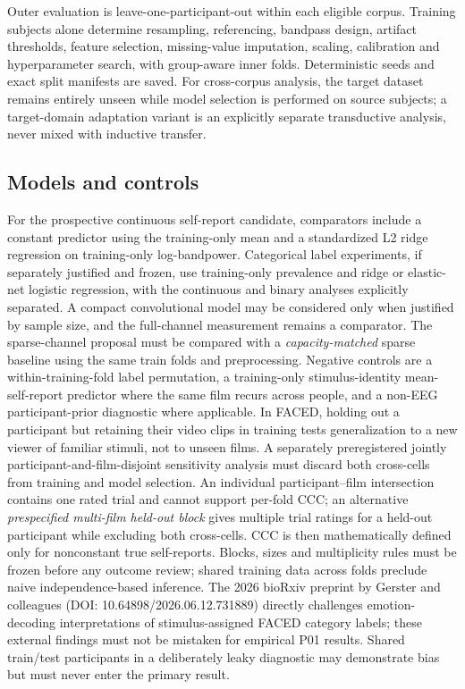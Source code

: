 Outer evaluation is leave-one-participant-out within each eligible corpus. Training subjects alone determine resampling, referencing, bandpass design, artifact thresholds, feature selection, missing-value imputation, scaling, calibration and hyperparameter search, with group-aware inner folds. Deterministic seeds and exact split manifests are saved. For cross-corpus analysis, the target dataset remains entirely unseen while model selection is performed on source subjects; a target-domain adaptation variant is an explicitly separate transductive analysis, never mixed with inductive transfer.

\subsection{Models and controls}
For the prospective continuous self-report candidate, comparators include a constant predictor using the training-only mean and a standardized L2 ridge regression on training-only log-bandpower. Categorical label experiments, if separately justified and frozen, use training-only prevalence and ridge or elastic-net logistic regression, with the continuous and binary analyses explicitly separated. A compact convolutional model may be considered only when justified by sample size, and the full-channel measurement remains a comparator. The sparse-channel proposal must be compared with a \emph{capacity-matched} sparse baseline using the same train folds and preprocessing. Negative controls are a within-training-fold label permutation, a training-only stimulus-identity mean-self-report predictor where the same film recurs across people, and a non-EEG participant-prior diagnostic where applicable. In FACED, holding out a participant but retaining their video clips in training tests generalization to a new viewer of familiar stimuli, not to unseen films. A separately preregistered jointly participant-and-film-disjoint sensitivity analysis must discard both cross-cells from training and model selection. An individual participant–film intersection contains one rated trial and cannot support per-fold CCC; an alternative \emph{prespecified multi-film held-out block} gives multiple trial ratings for a held-out participant while excluding both cross-cells. CCC is then mathematically defined only for nonconstant true self-reports. Blocks, sizes and multiplicity rules must be frozen before any outcome review; shared training data across folds preclude naive independence-based inference. The 2026 bioRxiv preprint by Gerster and colleagues (DOI: 10.64898/2026.06.12.731889) directly challenges emotion-decoding interpretations of stimulus-assigned FACED category labels; these external findings must not be mistaken for empirical P01 results. Shared train/test participants in a deliberately leaky diagnostic may demonstrate bias but must never enter the primary result.

